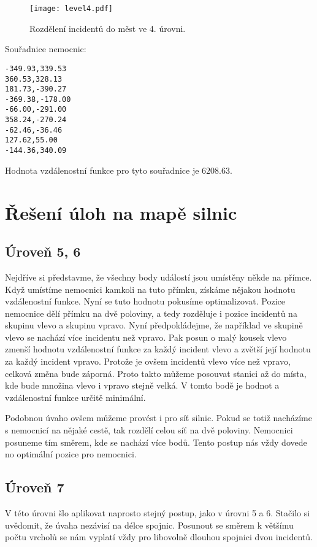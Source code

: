 \documentclass[12pt,a4paper]{article}
\begin{document}
\begin{figure}[ht]
\centering
\texttt{[image: level4.pdf]}
\caption{Rozdělení incidentů do měst ve 4. úrovni.}
\end{figure}

Souřadnice nemocnic:
\begin{verbatim}
-349.93,339.53
360.53,328.13
181.73,-390.27
-369.38,-178.00
-66.00,-291.00
358.24,-270.24
-62.46,-36.46
127.62,55.00
-144.36,340.09
\end{verbatim}

Hodnota vzdálenostní funkce pro tyto souřadnice je $6208.63$.

\section*{Řešení úloh na mapě silnic}
\subsection*{Úroveň 5, 6}
Nejdříve si představme, že všechny body událostí jsou umístěny někde na přímce. Když umístíme nemocnici kamkoli na tuto přímku, získáme nějakou hodnotu vzdálenostní funkce.
Nyní se tuto hodnotu pokusíme optimalizovat. Pozice nemocnice dělí přímku na dvě poloviny, a tedy rozděluje i pozice incidentů na skupinu vlevo a skupinu vpravo.
Nyní předpokládejme, že například ve skupině vlevo se nachází více incidentu než vpravo. Pak posun o malý kousek vlevo zmenší hodnotu vzdálenostní funkce za každý incident vlevo a zvětší její hodnotu za každý incident vpravo.
Protože je ovšem incidentů vlevo více než vpravo, celková změna bude záporná. Proto takto můžeme posouvat stanici až do místa, kde bude množina vlevo i vpravo stejně velká.
V tomto bodě je hodnot a vzdálenostní funkce určitě minimální.

Podobnou úvaho ovšem můžeme provést i pro síť silnic. Pokud se totiž nacházíme s nemocnicí na nějaké cestě, tak rozdělí celou síť na dvě poloviny. Nemocnici posuneme tím směrem, kde se nachází více bodů.
Tento postup nás vždy dovede no optimální pozice pro nemocnici.

\subsection*{Úroveň 7}
V této úrovni šlo aplikovat naprosto stejný postup, jako v úrovni 5 a 6. Stačilo si uvědomit, že úvaha nezávisí na délce spojnic. Posunout se směrem k většímu počtu vrcholů se nám vyplatí vždy pro libovolně dlouhou spojnici dvou incidentů.
\end{document}

